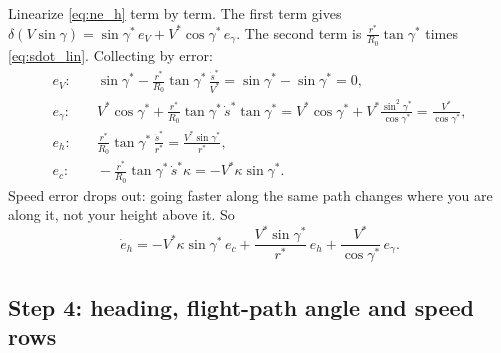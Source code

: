 \documentclass[11pt]{report}
\numberwithin{equation}{chapter}
\newcommand{\sdot}{\dot s}
\begin{document}
Linearize \cref{eq:ne_h} term by term. The first term gives
$\delta(V\sin\gamma) = \sin\gamma^*\,e_V + V^*\cos\gamma^*\,e_\gamma$. The second term is
$\frac{r^*}{R_0}\tan\gamma^*$ times \cref{eq:sdot_lin}. Collecting by error:
\begin{align*}
  e_V:&\quad \sin\gamma^* - \frac{r^*}{R_0}\tan\gamma^*\,\frac{\sdot^*}{V^*}
        = \sin\gamma^* - \sin\gamma^* = 0,\\
  e_\gamma:&\quad V^*\cos\gamma^* + \frac{r^*}{R_0}\tan\gamma^*\,\sdot^*\tan\gamma^*
        = V^*\cos\gamma^* + V^*\frac{\sin^2\gamma^*}{\cos\gamma^*} = \frac{V^*}{\cos\gamma^*},\\
  e_h:&\quad \frac{r^*}{R_0}\tan\gamma^*\,\frac{\sdot^*}{r^*} = \frac{V^*\sin\gamma^*}{r^*},\\
  e_c:&\quad -\frac{r^*}{R_0}\tan\gamma^*\,\sdot^*\kappa = -V^*\kappa\sin\gamma^* .
\end{align*}
Speed error drops out: going faster along the same path changes where you are along it,
not your height above it. So
\begin{equation}
  \dot e_h = -V^*\kappa\sin\gamma^*\,e_c + \frac{V^*\sin\gamma^*}{r^*}\,e_h + \frac{V^*}{\cos\gamma^*}\,e_\gamma .
\end{equation}

\subsection*{Step 4: heading, flight-path angle and speed rows}
\end{document}
